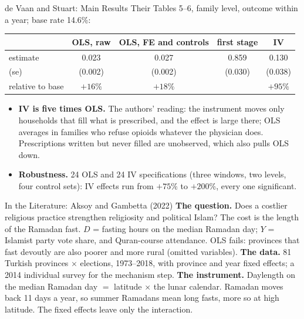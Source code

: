 \documentclass[aspectratio=169,11pt,xcolor=dvipsnames]{beamer}
\begin{document}
\begin{frame}{de Vaan and Stuart: Main Results}
Their Tables 5--6, family level, outcome within a year; base rate 14.6\%:
\begin{center}\small
\renewcommand{\arraystretch}{1.1}
\begin{tabular}{@{}lcccc@{}}
\toprule
 & OLS, raw & OLS, FE and controls & first stage & IV \\
\midrule
estimate & 0.023 & 0.027 & 0.859 & 0.130 \\
(se) & (0.002) & (0.002) & (0.030) & (0.038) \\
relative to base & $+16\%$ & $+18\%$ & & $+95\%$ \\
\bottomrule
\end{tabular}
\end{center}
\vskip2pt
\begin{itemize}\itemsep2pt
  \item \textbf{IV is five times OLS.} The authors' reading: the instrument
        moves only households that fill what is prescribed, and the effect
        is large there; OLS averages in families who refuse opioids whatever
        the physician does. Prescriptions written but never filled are
        unobserved, which also pulls OLS down.
  \item \textbf{Robustness.} 24 OLS and 24 IV specifications (three windows,
        two levels, four control sets): IV effects run from $+75\%$ to
        $+200\%$, every one significant.
\end{itemize}
\end{frame}

\begin{frame}{In the Literature: Aksoy and Gambetta (2022)}
\textbf{The question.} Does a costlier religious practice strengthen
religiosity and political Islam? The cost is the length of the Ramadan fast.
$D$ = fasting hours on the median Ramadan day; $Y$ = Islamist party vote
share, and Quran-course attendance. OLS fails: provinces that fast devoutly
are also poorer and more rural (omitted variables).
\vskip3pt
\textbf{The data.} 81 Turkish provinces $\times$ elections, 1973--2018, with
province and year fixed effects; a 2014 individual survey for the mechanism
step.
\vskip3pt
\textbf{The instrument.} Daylength on the median Ramadan day $=$ latitude
$\times$ the lunar calendar. Ramadan moves back 11 days a year, so summer
Ramadans mean long fasts, more so at high latitude. The fixed effects leave
only the interaction.
\end{frame}
\end{document}
